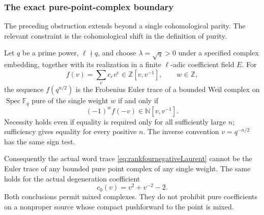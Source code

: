 \subsubsection{The exact pure-point-complex boundary}

The preceding obstruction extends beyond a single cohomological
parity. The relevant constraint is the cohomological shift in the
definition of purity.

\begin{finding}
\label{f:purepointLaurentcriterion}
Let \(q\) be a prime power, \(\ell\nmid q\), and choose
\(\lambda=\sqrt q>0\) under a specified complex embedding,
together with its realization in a finite \(\ell\)-adic
coefficient field \(E\).
For
\[
 f(v)=\sum_e c_ev^e\in\mathbb Z[v,v^{-1}],\qquad w\in\mathbb Z,
\]
the sequence \(f(q^{n/2})\) is the Frobenius Euler trace of a
bounded Weil complex on \(\operatorname{Spec}\mathbb F_q\)
pure of the single weight \(w\) if and only if
\begin{equation}\label{eq:purepointLaurentsign}
                 (-1)^w f(-v)\in\mathbb N[v,v^{-1}].
\end{equation}
Necessity holds even if equality is required only for all
sufficiently large \(n\); sufficiency gives equality for every
positive \(n\). The inverse convention \(v=q^{-n/2}\) has the
same sign test.

Consequently the actual word trace
\eqref{eq:rankfournegativeLaurent} cannot be the Euler trace
of any bounded pure point complex of any single weight.
The same holds for the actual degeneration coefficient
\[
                   c_0(v)=v^2+v^{-2}-2.
\]
Both conclusions permit mixed complexes. They do not prohibit
pure coefficients on a nonproper source whose compact
pushforward to the point is mixed.
\end{finding}

